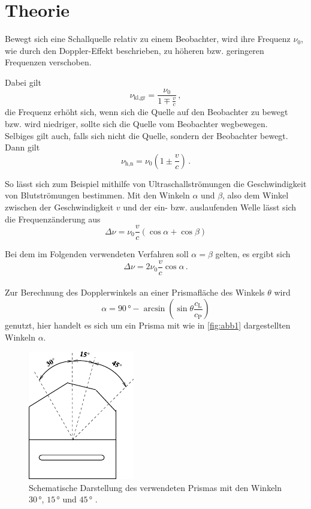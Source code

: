 \section{Theorie}
\label{sec:theorie}

Bewegt sich eine Schallquelle relativ zu einem
Beobachter, wird ihre Frequenz $\nu_0$, wie durch den
Doppler-Effekt beschrieben, zu höheren bzw.
geringeren Frequenzen verschoben.

Dabei gilt
\begin{equation}
    \nu_{\text{kl},\text{gr}} = \frac{\nu_0}
    {1 \mp \frac{v}{c}} \,,
    \label{eq:dopplerversch1}
\end{equation}
die Frequenz erhöht sich, wenn sich die 
Quelle auf den Beobachter zu bewegt bzw.
wird niedriger, sollte sich die Quelle vom
Beobachter wegbewegen. \\

Selbiges gilt auch, falls sich nicht die Quelle, 
sondern der Beobachter bewegt.
Dann gilt
\begin{equation}
    \nu_{\text{h},\text{n}} = \nu_0 \left(1 \pm \frac{v}{c} \right) \,.
    \label{eq:dopplerversch2}
\end{equation}

So lässt sich zum Beispiel mithilfe von Ultraschallströmungen
die Geschwindigkeit von Blutströmungen bestimmen.
Mit den Winkeln $\alpha$ und $\beta$, also dem Winkel zwischen der
Geschwindigkeit $v$ und der ein- bzw. auslaufenden Welle lässt sich
die Frequenzänderung aus
\begin{equation*}
    \Delta \nu = \nu_0 \frac{v}{c} (\cos \alpha + \cos \beta)
\end{equation*}

Bei dem im Folgenden verwendeten Verfahren soll 
$\alpha = \beta$ gelten, es ergibt sich
\begin{equation}
    \Delta \nu = 2 \nu_0 \frac{v}{c} \cos \alpha \,.
    \label{eq:dopplerversch}
\end{equation} \\

Zur Berechnung des Dopplerwinkels an einer Prismafläche 
des Winkels $\theta$ wird 
\begin{equation}
    \alpha = 90 \,° - \arcsin \left(\sin\theta \frac{c_\text{L}}{c_\text{P}} \right)
    \label{eq:dopplerwinkel}
\end{equation}
genutzt, hier handelt es sich um ein Prisma mit wie in \autoref{fig:abb1} dargestellten Winkeln $\alpha$.

\begin{figure}
    \centering
    \includegraphics{figures/abb1.pdf}
    \caption{Schematische Darstellung des verwendeten Prismas mit den Winkeln $30 \,°$, $15 \,°$ und $45 \,°$ \cite{ap05}.}
    \label{fig:abb1}
\end{figure}